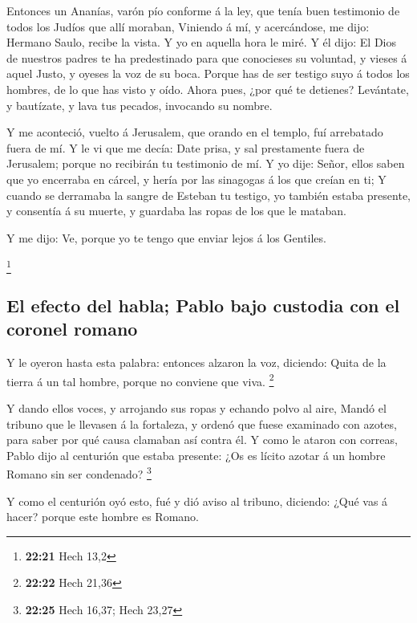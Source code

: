  Entonces un Ananías, varón pío conforme á la ley, que
tenía buen testimonio de todos los Judíos que allí moraban,
 Viniendo á mí, y acercándose, me dijo: Hermano Saulo,
recibe la vista. Y yo en aquella hora le miré.  Y él
dijo: El Dios de nuestros padres te ha predestinado para que conocieses
su voluntad, y vieses á aquel Justo, y oyeses la voz de su boca.
 Porque has de ser testigo suyo á todos los hombres, de
lo que has visto y oído.  Ahora pues, ¿por qué te
detienes? Levántate, y bautízate, y lava tus pecados, invocando su
nombre.

 Y me aconteció, vuelto á Jerusalem, que orando en el
templo, fuí arrebatado fuera de mí.  Y le vi que me
decía: Date prisa, y sal prestamente fuera de Jerusalem; porque no
recibirán tu testimonio de mí.  Y yo dije: Señor, ellos
saben que yo encerraba en cárcel, y hería por las sinagogas á los que
creían en ti;  Y cuando se derramaba la sangre de Esteban
tu testigo, yo también estaba presente, y consentía á su muerte, y
guardaba las ropas de los que le mataban.

 Y me dijo: Ve, porque yo te tengo que enviar lejos á los
Gentiles.

\footnote{\textbf{22:21} Hech 13,2}

\hypertarget{el-efecto-del-habla-pablo-bajo-custodia-con-el-coronel-romano}{%
\subsection{El efecto del habla; Pablo bajo custodia con el coronel
romano}\label{el-efecto-del-habla-pablo-bajo-custodia-con-el-coronel-romano}}

 Y le oyeron hasta esta palabra: entonces alzaron la voz,
diciendo: Quita de la tierra á un tal hombre, porque no conviene que
viva. \footnote{\textbf{22:22} Hech 21,36}

 Y dando ellos voces, y arrojando sus ropas y echando
polvo al aire,  Mandó el tribuno que le llevasen á la
fortaleza, y ordenó que fuese examinado con azotes, para saber por qué
causa clamaban así contra él.  Y como le ataron con
correas, Pablo dijo al centurión que estaba presente: ¿Os es lícito
azotar á un hombre Romano sin ser condenado? \footnote{\textbf{22:25}
  Hech 16,37; Hech 23,27}

 Y como el centurión oyó esto, fué y dió aviso al
tribuno, diciendo: ¿Qué vas á hacer? porque este hombre es Romano.

